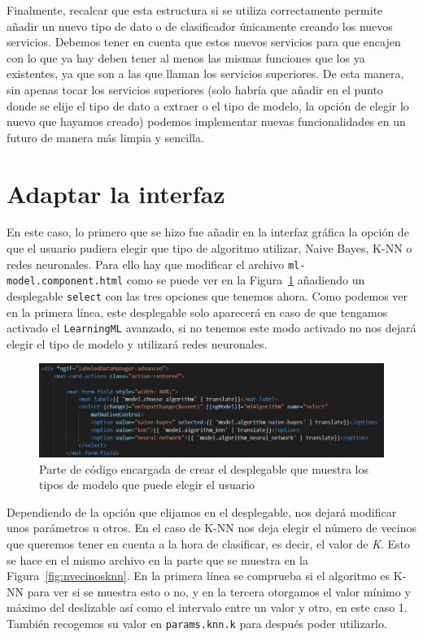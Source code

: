 \documentclass[a4paper, 12pt]{book}
\begin{document}
Finalmente, recalcar que esta estructura si se utiliza correctamente permite añadir un nuevo tipo de dato o de clasificador únicamente creando los nuevos servicios. Debemos tener en cuenta que estos nuevos servicios para que encajen con lo que ya hay deben tener al menos las mismas funciones que los ya existentes, ya que son a las que llaman los servicios superiores. De esta manera, sin apenas tocar los servicios superiores (solo habría que añadir en el punto donde se elije el tipo de dato a extraer o el tipo de modelo, la opción de elegir lo nuevo que hayamos creado) podemos implementar nuevas funcionalidades en un futuro de manera más limpia y sencilla.



\section{Adaptar la interfaz} 
\label{sec:interfaz}

En este caso, lo primero que se hizo fue añadir en la interfaz gráfica la opción de que el usuario pudiera elegir que tipo de algoritmo utilizar, Naive Bayes, K-NN o redes neuronales. Para ello hay que modificar el archivo \texttt{ml-model.component.html} como se puede ver en la Figura~\ref{fig:desplegable} añadiendo un desplegable \texttt{select} con las tres opciones que tenemos ahora. Como podemos ver en la primera línea, este desplegable solo aparecerá en caso de que tengamos activado el \texttt{LearningML} avanzado, si no tenemos este modo activado no nos dejará elegir el tipo de modelo y utilizará redes neuronales.\\

\begin{figure}
	\centering
	\includegraphics[width=12cm, keepaspectratio]{img/desplegable}
	\caption{Parte de código encargada de crear el desplegable que muestra los tipos de modelo que puede elegir el usuario}									\label{fig:desplegable}
\end{figure}

Dependiendo de la opción que elijamos en el desplegable, nos dejará modificar unos parámetros u otros. 
En el caso de K-NN nos deja elegir el número de vecinos que queremos tener en cuenta a la hora de clasificar, es decir, el valor de \emph{K}. Esto se hace en el mismo archivo en la parte que se muestra en la Figura~\ref{fig:nvecinosknn}. En la primera línea se comprueba si el algoritmo es K-NN para ver si se muestra esto o no, y en la tercera otorgamos el valor mínimo y máximo del deslizable así como el intervalo entre un valor y otro, en este caso 1. También recogemos su valor en \texttt{params.knn.k} para después poder utilizarlo.
\end{document}

